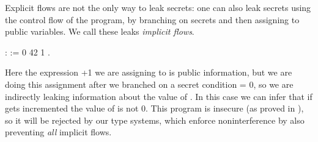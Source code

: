 \documentclass[12pt]{report}
\begin{document}
 Explicit flows are not the only way to leak secrets: one can also
    leak secrets using the control flow of the program, by branching
    on secrets and then assigning to public variables. We call these
    leaks \textit{implicit flows}. 
\begin{coqdoccode}
\coqdocemptyline
\coqdocnoindent
{}  :  :=\coqdoceol
\coqdocindent{1.00em}
    0\coqdoceol
\coqdocindent{2.50em}
   42\coqdoceol
\coqdocindent{2.50em}
   1 \coqdoceol
\coqdocindent{2.50em}
 .\coqdoceol
\coqdocemptyline
\end{coqdoccode}
Here the expression +1 we are assigning to  is public
    information, but we are doing this assignment after we branched on
    a secret condition  = 0, so we are indirectly leaking
    information about the value of . In this case we can infer that
    if  gets incremented the value of  is not 0. This program
    is insecure (as proved in ), so it will be
    rejected by our type systems, which enforce noninterference by
    also preventing \textit{all} implicit flows. 
\end{document}
